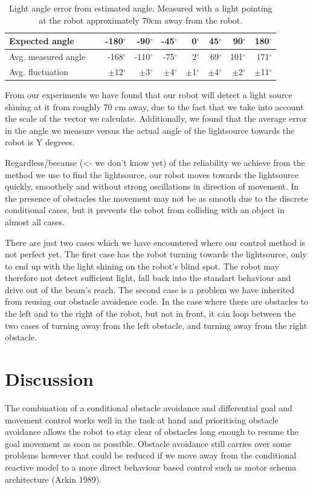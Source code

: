 \documentclass[paper=a4, fontsize=12pt]{scrartcl}	%
\numberwithin{equation}{section}		%
\numberwithin{figure}{section}			%
\numberwithin{table}{section}				%
\begin{document}
\begin{table}
  \begin{tabular}{l | r r r r r r r |}
      Expected angle   		 & -180\(^{\circ}\)  & -90\(^{\circ}\)  & -45\(^{\circ}\)  & 0\(^{\circ}\)    & 45\(^{\circ}\)   & 90\(^{\circ}\)   & 180\(^{\circ}\) \\ \hline
      Avg. measured angle	 & -168\(^{\circ}\)  & -110\(^{\circ}\) & -75\(^{\circ}\)  & 2\(^{\circ}\)    & 69\(^{\circ}\)   & 101\(^{\circ}\)  & 171\(^{\circ}\) \\ \hline
      Avg. fluctuation		 & \(\pm\)12\(^{\circ}\) & \(\pm\)3\(^{\circ}\) & \(\pm\)4\(^{\circ}\) & \(\pm\)1\(^{\circ}\) & \(\pm\)4\(^{\circ}\) & \(\pm\)2\(^{\circ}\) & \(\pm\)11\(^{\circ}\) \\	
  \end{tabular}
  \caption{Light angle error from estimated angle. Measured with a light pointing at the robot approximately 70cm away from the robot.}
  \label{tab:angleError}
\end{table}

From our experiments we have found that our robot will detect a light source shining at it from roughly 70 cm away, due to the fact that we take into account the scale of the vector we calculate. Additionally, we found that the average error in the angle we measure versus the actual angle of the lightsource towards the robot is Y degrees.

Regardless/because (<- we don't know yet) of the reliability we achieve from the method we use to find the lightsource, our robot moves towards the lightsource quickly, smoothely and without strong oscillations in direction of movement. In the presence of obstacles the movement may not be as smooth due to the discrete conditional cases, but it prevents the robot from colliding with an object in almost all cases.

There are just two cases which we have encountered where our control method is not perfect yet. The first case has the robot turning towards the lightsource, only to end up with the light shining on the robot's blind spot. The robot may therefore not detect sufficient light, fall back into the standart behaviour and drive out of the beam's reach. The second case is a problem we have inherited from reusing our obstacle avoidence code. In the case where there are obstacles to the left and to the right of the robot, but not in front, it can loop between the two cases of turning away from the left obstacle, and turning away from the right obstacle.
\section{Discussion}
The combination of a conditional obstacle avoidance and differential goal and movement control works well in the task at hand and prioritising obstacle avoidance allows the robot to stay clear of obstacles long enough to resume the goal movement as soon as possible. Obstacle avoidance still carries over some problems however that could be reduced if we move away from the conditional reactive model to a more direct behaviour based control such as motor schema architecture (Arkin 1989).
\end{document}
